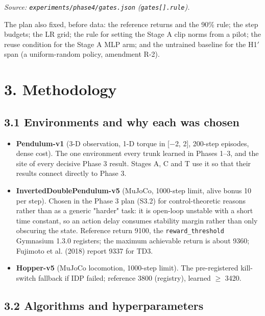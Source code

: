 \documentclass[11pt]{article}
\begin{document}
\emph{Source: \texttt{experiments/\allowbreak{}phase4/\allowbreak{}gates.\allowbreak{}json} (\texttt{gates[].rule}).}



The plan also fixed, before data: the reference returns and the 90\% rule; the step budgets; the LR grid; the rule for setting the Stage A clip norms from a pilot; the reuse condition for the Stage A MLP arm; and the untrained baseline for the H1$'$ span (a uniform-random policy, amendment R-2).



\section*{3. Methodology}



\subsection*{3.1 Environments and why each was chosen}



\begin{itemize}
\item \textbf{Pendulum-v1} (3-D observation, 1-D torque in [$-$2, 2], 200-step episodes, dense cost). The one environment every trunk learned in Phases 1--3, and the site of every decisive Phase 3 result. Stages A, C and T use it so that their results connect directly to Phase 3.
\item \textbf{InvertedDoublePendulum-v5} (MuJoCo, 1000-step limit, alive bonus 10 per step). Chosen in the Phase 3 plan (S3.2) for control-theoretic reasons rather than as a generic "harder" task: it is open-loop unstable with a short time constant, so an action delay consumes stability margin rather than only obscuring the state. Reference return 9100, the \texttt{reward\_\allowbreak{}threshold} Gymnasium 1.3.0 registers; the maximum achievable return is about 9360; Fujimoto et al. (2018) report 9337 for TD3.
\item \textbf{Hopper-v5} (MuJoCo locomotion, 1000-step limit). The pre-registered kill-switch fallback if IDP failed; reference 3800 (registry), learned $\geq$ 3420.
\end{itemize}



\subsection*{3.2 Algorithms and hyperparameters}
\end{document}
